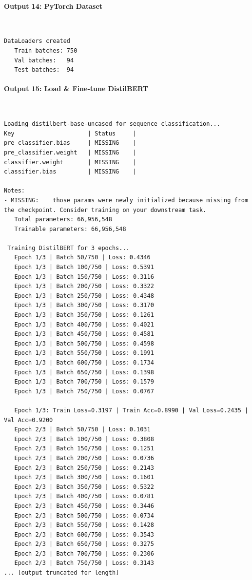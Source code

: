 \documentclass[12pt,a4paper,oneside]{report}
\begin{document}
\paragraph{Output 14: PyTorch Dataset}\mbox{}\\[-1ex]
\begin{Verbatim}[commandchars=\\\{\},breaklines=true,breakanywhere=true,fontsize=\scriptsize,frame=leftline,framesep=2mm,rulecolor=\color{gray}]
   DataLoaders created
   Train batches: 750
   Val batches:   94
   Test batches:  94
\end{Verbatim}
\paragraph{Output 15: Load \& Fine-tune DistilBERT}\mbox{}\\[-1ex]
\begin{Verbatim}[commandchars=\\\{\},breaklines=true,breakanywhere=true,fontsize=\scriptsize,frame=leftline,framesep=2mm,rulecolor=\color{gray}]
 Loading distilbert-base-uncased for sequence classification...
Key                     | Status     |
pre_classifier.bias     | MISSING    |
pre_classifier.weight   | MISSING    |
classifier.weight       | MISSING    |
classifier.bias         | MISSING    |

Notes:
- MISSING:    those params were newly initialized because missing from the checkpoint. Consider training on your downstream task.
   Total parameters: 66,956,548
   Trainable parameters: 66,956,548

 Training DistilBERT for 3 epochs...
   Epoch 1/3 | Batch 50/750 | Loss: 0.4346
   Epoch 1/3 | Batch 100/750 | Loss: 0.5391
   Epoch 1/3 | Batch 150/750 | Loss: 0.3116
   Epoch 1/3 | Batch 200/750 | Loss: 0.3322
   Epoch 1/3 | Batch 250/750 | Loss: 0.4348
   Epoch 1/3 | Batch 300/750 | Loss: 0.3170
   Epoch 1/3 | Batch 350/750 | Loss: 0.1261
   Epoch 1/3 | Batch 400/750 | Loss: 0.4021
   Epoch 1/3 | Batch 450/750 | Loss: 0.4581
   Epoch 1/3 | Batch 500/750 | Loss: 0.4598
   Epoch 1/3 | Batch 550/750 | Loss: 0.1991
   Epoch 1/3 | Batch 600/750 | Loss: 0.1734
   Epoch 1/3 | Batch 650/750 | Loss: 0.1398
   Epoch 1/3 | Batch 700/750 | Loss: 0.1579
   Epoch 1/3 | Batch 750/750 | Loss: 0.0767

   Epoch 1/3: Train Loss=0.3197 | Train Acc=0.8990 | Val Loss=0.2435 | Val Acc=0.9200
   Epoch 2/3 | Batch 50/750 | Loss: 0.1031
   Epoch 2/3 | Batch 100/750 | Loss: 0.3808
   Epoch 2/3 | Batch 150/750 | Loss: 0.1251
   Epoch 2/3 | Batch 200/750 | Loss: 0.0736
   Epoch 2/3 | Batch 250/750 | Loss: 0.2143
   Epoch 2/3 | Batch 300/750 | Loss: 0.1601
   Epoch 2/3 | Batch 350/750 | Loss: 0.5322
   Epoch 2/3 | Batch 400/750 | Loss: 0.0781
   Epoch 2/3 | Batch 450/750 | Loss: 0.3446
   Epoch 2/3 | Batch 500/750 | Loss: 0.0734
   Epoch 2/3 | Batch 550/750 | Loss: 0.1428
   Epoch 2/3 | Batch 600/750 | Loss: 0.3543
   Epoch 2/3 | Batch 650/750 | Loss: 0.3275
   Epoch 2/3 | Batch 700/750 | Loss: 0.2306
   Epoch 2/3 | Batch 750/750 | Loss: 0.3143
... [output truncated for length]
\end{Verbatim}
\end{document}
